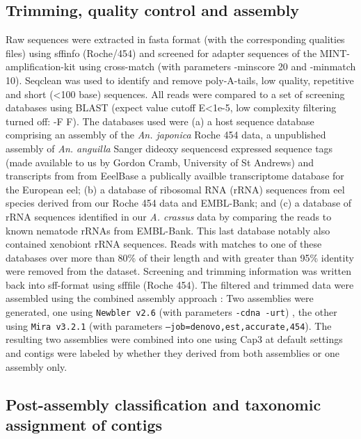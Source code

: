 \documentclass[10pt]{bmc_article}
\newenvironment{bmcformat}{\begin{raggedright}\baselineskip20pt\sloppy\setboolean{publ}{false}}{\end{raggedright}\baselineskip20pt\sloppy}
\begin{document}
\begin{bmcformat}
\subsection*{Trimming, quality control and assembly}

Raw sequences were extracted in fasta format (with the corresponding
qualities files) using sffinfo (Roche/454) and screened for adapter
sequences of the MINT-amplification-kit using cross-match \cite{PHRAP}
(with parameters -minscore 20 and -minmatch 10). Seqclean
\cite{tgicl_pertea} was used to identify and remove poly-A-tails, low
quality, repetitive and short (<100 base) sequences. All reads were
compared to a set of screening databases using BLAST (expect value
cutoff E<1e-5, low complexity filtering turned off: -F F). The
databases used were (a) a host sequence database comprising an
assembly of the \textit{An. japonica} Roche 454 data, a unpublished
assembly of \textit{An. anguilla} Sanger dideoxy sequencesd expressed
sequence tags (made available to us by Gordon Cramb, University of St
Andrews) and transcripts from from EeelBase \cite{pmid21080939} a
publically availble transcriptome database for the European eel; (b) a
database of ribosomal RNA (rRNA) sequences from eel species derived
from our Roche 454 data and EMBL-Bank; and (c) a database of rRNA
sequences identified in our \textit{A. crassus} data by comparing the
reads to known nematode rRNAs from EMBL-Bank. This last database
notably also contained xenobiont rRNA sequences. Reads with matches to
one of these databases over more than 80\% of their length and with
greater than 95\% identity were removed from the dataset. Screening
and trimming information was written back into sff-format using
sfffile (Roche 454). The filtered and trimmed data were assembled
using the combined assembly approach \cite{pmid20950480}: Two
assemblies were generated, one using \texttt{Newbler v2.6}
\cite{pmid16056220} (with parameters \texttt{-cdna -urt}) , the other
using \texttt{Mira v3.2.1} \cite{miraEST} (with parameters
\texttt{--job=denovo,est,accurate,454}). The resulting two assemblies
were combined into one using Cap3 \cite{Cap3_Huang} at default
settings and contigs were labeled by whether they derived from both
assemblies or one assembly only.

\subsection*{Post-assembly classification and taxonomic assignment of
  contigs}


\end{bmcformat}
\end{document}
